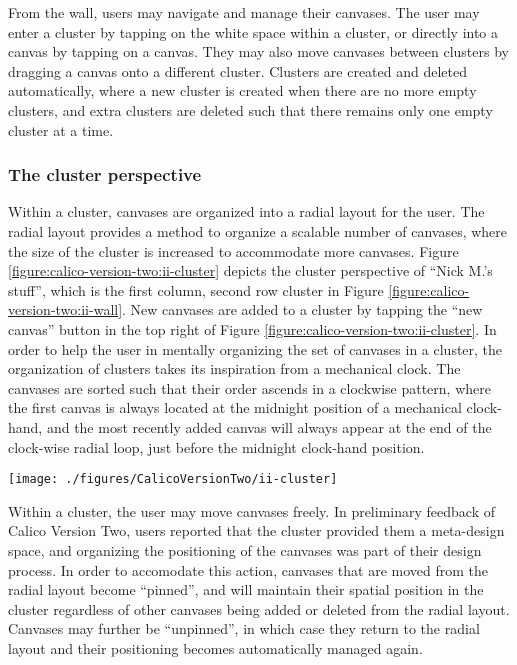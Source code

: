 From the wall, users may navigate and manage their canvases. The user may enter a cluster by tapping on the white space within a cluster, or directly into a canvas by tapping on a canvas. They may also move canvases between clusters by dragging a canvas onto a different cluster. Clusters are created and deleted automatically, where a new cluster is created when there are no more empty clusters, and extra clusters are deleted such that there remains only one empty cluster at a time.

\subsubsection{The cluster perspective}

Within a cluster, canvases are organized into a radial layout for the user. The radial layout provides a method to organize a scalable number of canvases, where the size of the cluster is increased to accommodate more canvases. Figure \ref{figure:calico-version-two:ii-cluster} depicts the cluster perspective of ``Nick M.'s stuff'', which is the first column, second row cluster in Figure \ref{figure:calico-version-two:ii-wall}. New canvases are added to a cluster by tapping the ``new canvas'' button in the top right of Figure \ref{figure:calico-version-two:ii-cluster}. In order to help the user in mentally organizing the set of canvases in a cluster, the organization of clusters takes its inspiration from a mechanical clock. The canvases are sorted such that their order ascends in a clockwise pattern, where the first canvas is always located at the midnight position of a mechanical clock-hand, and the most recently added canvas will always appear at the end of the clock-wise radial loop, just before the midnight clock-hand position. 

\begin{figure*}[tbh]
  \centering
  \texttt{[image: ./figures/CalicoVersionTwo/ii-cluster]}
  \caption{The cluster perspective of ``Nick M.'s stuff''.}
  \label{figure:calico-version-two:ii-cluster}
\end{figure*}

Within a cluster, the user may move canvases freely. In preliminary feedback of Calico Version Two, users reported that the cluster provided them a meta-design space, and organizing the positioning of the canvases was part of their design process. In order to accomodate this action, canvases that are moved from the radial layout become ``pinned'', and will maintain their spatial position in the cluster regardless of other canvases being added or deleted from the radial layout. Canvases may further be ``unpinned'', in which case they return to the radial layout and their positioning becomes automatically managed again.

